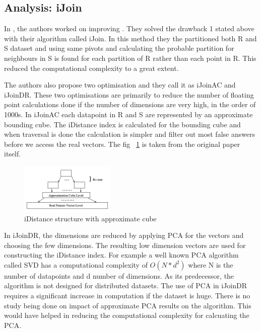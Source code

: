 \documentclass[conference]{IEEEtran}
\begin{document}
\bigskip

\subsection{Analysis: iJoin}
In \cite{yu_efficient_2007}, the authors worked on improving
\cite{jagadish_idistance:_2005}. They solved the drawback 1 stated
above with their algorithm called iJoin. In this method they the
partitioned both R and S dataset and using same pivots and
calculating the probable partition for neighbours in S is found for each
partition of R rather than each point in R. This reduced the
computational complexity to a great extent.

\bigskip

The authors also propose two optimisation and they call it as iJoinAC
and iJoinDR. These two optimisations are primarily to reduce the
number of floating point calculations done if the number of dimensions
are very high, in the order of 1000s. In iJoinAC each datapoint in R
and S are represented by an approximate bounding cube. The iDistance
index is calculated for the bounding cube and when traversal is done
the calculation is simpler and filter out most false answers before we
access the real vectors. The fig ~\ref{fig:iJoinAC} is taken from the original
paper itself.

\begin{figure}[here]
\includegraphics[width=0.4\textwidth]{iJoinAC.png}
\caption{iDistance structure with approximate cube}
\label{fig:iJoinAC}
\end{figure}

In iJoinDR, the dimensions are reduced by applying PCA for the vectors
and choosing the few dimensions. The resulting low dimension vectors
are used for constructing the iDistance index. For example a well
known PCA algorithm called SVD has a computational complexity of
$O(N * d^2)$ where N is the number of datapoints and d number of
dimensions.
\bigskip
As its predecessor, the algorithm is not designed for distributed
datasets. The use of PCA in iJoinDR requires a significant increase in
computation if the dataset is huge. There is no study being done on
impact of approximate PCA results on the algorithm. This would have
helped in reducing the computational complexity for calcuating the
PCA.
\end{document}
